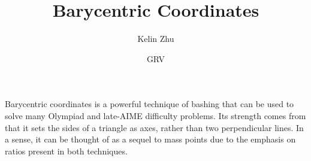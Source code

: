 \documentclass{article}
\title{Barycentric Coordinates}
\author{Kelin Zhu}
\date{GRV}
\begin{document}
\maketitle
Barycentric coordinates is a powerful technique of bashing that can be used to solve many Olympiad and late-AIME difficulty problems. Its strength comes from that it sets the sides of a triangle as axes, rather than two perpendicular lines. In a sense, it can be thought of as a sequel to mass points due to the emphasis on ratios present in both techniques.
\end{document}
